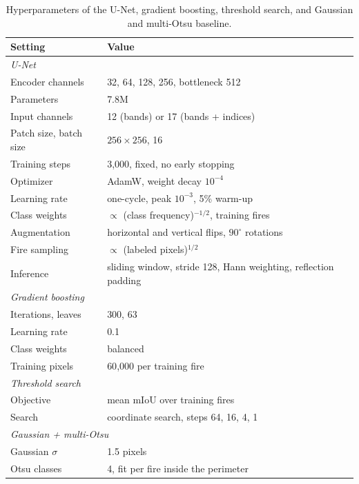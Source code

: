 \documentclass[10pt]{article}
\begin{document}
\begin{table}[H]
  \centering
  \small
  \begin{tabular}{ll}
    \toprule
    Setting & Value \\
    \midrule
    \multicolumn{2}{l}{\emph{U-Net}} \\
    Encoder channels & 32, 64, 128, 256, bottleneck 512 \\
    Parameters & 7.8M \\
    Input channels & 12 (bands) or 17 (bands + indices) \\
    Patch size, batch size & $256 \times 256$, 16 \\
    Training steps & 3{,}000, fixed, no early stopping \\
    Optimizer & AdamW, weight decay $10^{-4}$ \\
    Learning rate & one-cycle, peak $10^{-3}$, 5\% warm-up \\
    Class weights & $\propto$ (class frequency)$^{-1/2}$, training fires \\
    Augmentation & horizontal and vertical flips, $90^\circ$ rotations \\
    Fire sampling & $\propto$ (labeled pixels)$^{1/2}$ \\
    Inference & sliding window, stride 128, Hann weighting, reflection padding \\
    \midrule
    \multicolumn{2}{l}{\emph{Gradient boosting}} \\
    Iterations, leaves & 300, 63 \\
    Learning rate & 0.1 \\
    Class weights & balanced \\
    Training pixels & 60{,}000 per training fire \\
    \midrule
    \multicolumn{2}{l}{\emph{Threshold search}} \\
    Objective & mean mIoU over training fires \\
    Search & coordinate search, steps 64, 16, 4, 1 \\
    \midrule
    \multicolumn{2}{l}{\emph{Gaussian + multi-Otsu}} \\
    Gaussian $\sigma$ & 1.5 pixels \\
    Otsu classes & 4, fit per fire inside the perimeter \\
    \bottomrule
  \end{tabular}
  \caption{Hyperparameters of the U-Net, gradient boosting, threshold search, and Gaussian and multi-Otsu baseline.}
  \label{tab:hparams}
\end{table}
\end{document}

